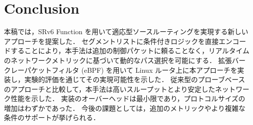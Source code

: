 \documentclass[conference]{IEEEtran}
\begin{document}
\section{Conclusion}

本稿では，SRv6 Function を用いて適応型ソースルーティングを実現する新しいアプローチを提案した．
セグメントリストに条件付きロジックを直接エンコードすることにより，本手法は追加の制御パケットに頼ることなく，リアルタイムのネットワークメトリックに基づいて動的なパス選択を可能にする．
拡張バークレーパケットフィルタ (eBPF) を用いて Linux ルータ上に本アプローチを実装し，実験的評価を通じてその実現可能性を示した．
従来型のプローブベースのアプローチと比較して，本手法は高いスループットとより安定したネットワーク性能を示した．
実装のオーバーヘッドは最小限であり，プロトコルサイズの増加はわずかであった．
今後の課題としては，追加のメトリックやより複雑な条件のサポートが挙げられる．



\end{document}
